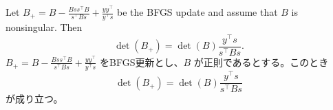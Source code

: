 \documentclass[0_main]{subfiles}
\begin{document}
\begin{proposition}\label{prop:bfgs-determinant}
    \ifEn
        Let $B_{+} = B - \frac{Bss^\top B}{s^\top Bs} + \frac{yy^\top}{y^\top s}$ be the BFGS update and assume that $B$ is nonsingular. Then
        \begin{equation*}
            \det(B_{+}) = \det(B) \frac{y^\top s}{s^\top Bs}.
        \end{equation*}
    \else
        $B_{+} = B - \frac{Bss^\top B}{s^\top Bs} + \frac{yy^\top}{y^\top s}$ をBFGS更新とし、$B$ が正則であるとする。このとき
        \begin{equation*}
            \det(B_{+}) = \det(B) \frac{y^\top s}{s^\top Bs}
        \end{equation*}
        が成り立つ。
    \fi
\end{proposition}
\end{document}

